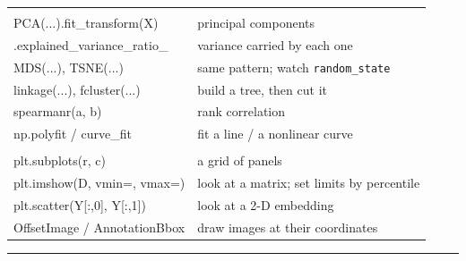 \documentclass[11pt]{article}
\begin{document}
\begin{center}
\begin{tabular}{@{}>{\ttfamily}l l@{}}
\multicolumn{2}{@{}l}{\textit{\textnormal{the methods}}}\\
PCA(...).fit\_transform(X)    & principal components \\
.explained\_variance\_ratio\_ & variance carried by each one \\
MDS(...), TSNE(...)           & same pattern; watch \texttt{random\_state} \\
linkage(...), fcluster(...)   & build a tree, then cut it \\
spearmanr(a, b)               & rank correlation \\
np.polyfit / curve\_fit       & fit a line / a nonlinear curve \\[3pt]
\multicolumn{2}{@{}l}{\textit{\textnormal{plotting}}}\\
plt.subplots(r, c)            & a grid of panels \\
plt.imshow(D, vmin=, vmax=)   & look at a matrix; set limits by percentile \\
plt.scatter(Y[:,0], Y[:,1])   & look at a 2-D embedding \\
OffsetImage / AnnotationBbox  & draw images at their coordinates \\
\bottomrule
\end{tabular}
\end{center}

\vspace{6pt}
\hrule
\vspace{6pt}
\end{document}
